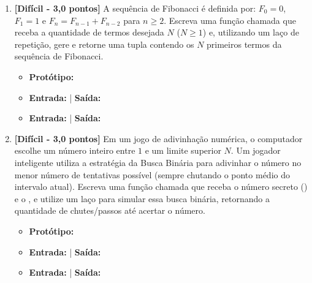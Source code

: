 \begin{enumerate}[label=\textbf{Q\arabic*.}, start=25]
\item \textbf{[Difícil - 3,0 pontos]} A sequência de Fibonacci é definida por: $F_0 = 0$, $F_1 = 1$ e $F_n = F_{n-1} + F_{n-2}$ para $n \ge 2$. Escreva uma função chamada  que receba a quantidade de termos desejada $N$ ($N \ge 1$) e, utilizando um laço de repetição, gere e retorne uma tupla contendo os $N$ primeiros termos da sequência de Fibonacci.

\begin{itemize}[leftmargin=*]
    \item \textbf{Protótipo:}\newline {}\\
    \item \textbf{Entrada:}  | \textbf{Saída:} 
    \item \textbf{Entrada:}  | \textbf{Saída:} 
\end{itemize}



\vspace{0.4cm}

\item \textbf{[Difícil - 3,0 pontos]} Em um jogo de adivinhação numérica, o computador escolhe um número inteiro entre $1$ e um limite superior $N$. Um jogador inteligente utiliza a estratégia da Busca Binária para adivinhar o número no menor número de tentativas possível (sempre chutando o ponto médio do intervalo atual). Escreva uma função chamada  que receba o número secreto () e o , e utilize um laço  para simular essa busca binária, retornando a quantidade de chutes/passos até acertar o número.

\begin{itemize}[leftmargin=*]
    \item \textbf{Protótipo:}\newline {}
    \item \textbf{Entrada:}  | \textbf{Saída:} 
    \item \textbf{Entrada:}  | \textbf{Saída:} 
\end{itemize}



\vspace{0.4cm}

\end{enumerate}


